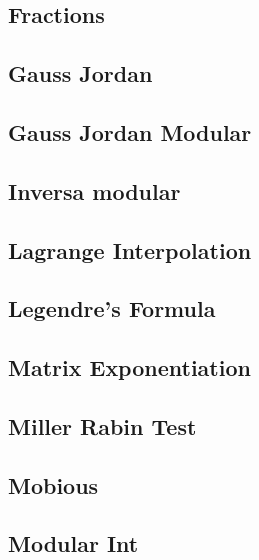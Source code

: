 \subsection{Fractions}
\raggedbottom
\hrulefill
\subsection{Gauss Jordan}
\raggedbottom
\hrulefill
\subsection{Gauss Jordan Modular}
\raggedbottom
\hrulefill
\subsection{Inversa modular}
\raggedbottom
\hrulefill
\subsection{Lagrange Interpolation}
\raggedbottom
\hrulefill
\subsection{Legendre's Formula}
\raggedbottom
\hrulefill
\subsection{Matrix Exponentiation}
\raggedbottom
\hrulefill
\subsection{Miller Rabin Test}
\raggedbottom
\hrulefill
\subsection{Mobious}
\raggedbottom
\hrulefill
\subsection{Modular Int}
\raggedbottom
\hrulefill
